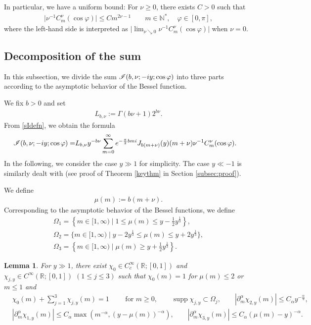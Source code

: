 \documentclass[10pt,a4paper]{article}
\numberwithin{equation}{section}
\newtheorem{Lemma}[Theorem]{Lemma}
\def\R{\mathbb{R}}%
\DeclareMathOperator{\supp}{supp}%
\def\a{\alpha}
\def\f{\varphi}
\def\m{\mu}
\def\n{\nu}
\def\pa{\partial}
\newcommand{\sI}{\mathscr{I}}
\begin{document}
In particular, we have a uniform bound: For $\n\geq 0$, there exists $C>0$ such that
\begin{align}\label{Gegenunif}
\big|\n^{-1}C_m^{\n}(\cos \f)\big|\leq Cm^{2\n-1}\qquad m\in \mathbb{N}^*,\quad \f\in[0,\pi],
\end{align}
where the left-hand side is interpreted as $\big|\lim_{\n\searrow 0}\n^{-1}C_m^{\n}(\cos \f)\big|$ when $\n=0$.

\subsection{Decomposition of the sum}\label{subsecdecom}

In this subsection, we divide the sum $\sI(b,\nu;- {\rm i}y;\cos\f)$ into three parts according to the asymptotic behavior of the Bessel function.

We fix $b>0$ and set
\begin{align}\label{cbndef}
L_{b,\n}:=\Gamma(b\nu+1)2^{b\n}.
\end{align}
From \eqref{sIdefn}, we obtain the formula
\begin{align}\label{sumbesell}
\sI(b,\nu;- {\rm i}y;\cos\f)=&L_{b,\n}y^{-b\n}\sum_{m=0}^{\infty}{\rm e}^{-\frac{\pi}{2}bm{\rm i}}J_{b(m+\n)}(y)(m+\nu)\n^{-1}C^{\nu}_m(\cos\f).
\end{align}
In the following, we consider the case $y\gg 1$ for simplicity. The case $y\ll -1$ is similarly dealt with (see proof of Theorem \ref{keythm} in Section \ref{subsec:proof}).






We define
\begin{align}\label{muemudef}
\m(m):=b(m+\n).
\end{align}
Corresponding to the asymptotic behavior of the Bessel functions, we define
\begin{gather*}
\Omega_1=\left\{m\in[1,\infty)\mid 1\leq \m(m)\leq y-\frac{1}{2}y^{\frac{1}{3}}\right\},\\ \Omega_2=\big\{m\in[1,\infty)\mid y-2y^{\frac{1}{3}}\leq \m(m)\leq y+2y^{\frac{1}{3}}\big\},\\
\Omega_3=\left\{m\in[1,\infty)\mid \m(m)\geq y+\frac{1}{2}y^{\frac{1}{3}}\right\}.
\end{gather*}

\begin{Lemma}\label{Cutoff}
For $y\gg 1$,
there exist $\chi_0\in C_c^{\infty}(\R;[0,1])$ and $\chi_{j,y}\in C^{\infty}(\R;[0,1])$ $(1\le j\le 3)$ such that $\chi_0(m)=1$ for $\m(m)\leq 2$ or $m\leq 1$ and
\begin{align}
&\chi_0(m)+\sum_{j=1}^3\chi_{j,y}(m)=1\qquad \text{ for $m\geq 0$},\qquad \supp \chi_{j,y}\subset \Omega_j,\qquad |\pa_m^{\a}\chi_{2,y}(m)|\leq C_{\a}y^{-\frac{\a}{3}},\nonumber\\
&|\pa_m^{\a}\chi_{1,y}(m)|\leq C_{\a}\max(m^{-\a}, (y-\m(m))^{-\a}),\qquad |\pa_m^{\a}\chi_{3,y}(m)|\leq C_{\a}(\m(m)-y)^{-\a}\label{POUproper}.
\end{align}
\end{Lemma}
\end{document}
